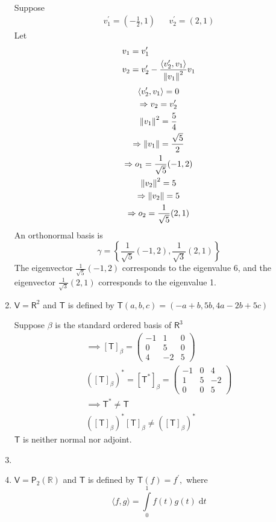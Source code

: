 \begin{enumerate}
\begin{itemize}
\begin{gather}
\end{gather}
\end{itemize}
Suppose
\begin{align}
v_1^\prime = (-\frac{1}{2},1) & & v_2^\prime = (2,1)
\end{align}
Let
\begin{align}
v_1 &= v_1^\prime\\
v_2 &= v_2^\prime - \frac{\langle v_2^\prime, v_1\rangle}{\left\lVert v_1\right\rVert^2}v_1
\end{align}
\begin{gather}
\langle v_2^\prime,v_1\rangle = 0\\
\Rightarrow v_2 = v_2^\prime\\
\left\lVert v_1\right\rVert^2 = \frac{5}{4}\\
\Rightarrow \left\lVert v_1\right\rVert = \frac{\sqrt{5}}{2}\\
\Rightarrow o_1 = \frac{1}{\sqrt{5}}(-1,2)\\
\left\lVert v_2\right\rVert^2 = 5 \\
\Rightarrow \left\lVert v_2\right\rVert =5\\
\Rightarrow o_2 = \frac{1}{\sqrt{5}}(2,1)
\end{gather}
An orthonormal basis is
\begin{equation}
\gamma = \left\{\frac{1}{\sqrt{5}}(-1,2),\frac{1}{\sqrt{3}}(2,1)\right\}
\end{equation}
The eigenvector $\frac{1}{\sqrt{5}}(-1,2)$ corresponds to the
eigenvalue 6, and the eigenvector $\frac{1}{\sqrt{3}}(2,1)$
corresponds to the eigenvalue 1.

\item $\mathsf{V} = \mathsf{R}^2$ and $\mathsf{T}$ is defined by
  $\mathsf{T}(a,b,c) = (-a+b,5b,4a-2b+5c)$

Suppose $\beta$ is the standard ordered basis of $\mathsf{R}^3$
\begin{gather}
\implies [\mathsf{T}]_\beta = \begin{pmatrix}
-1 & 1 & 0\\
0 & 5 & 0\\
4 & -2 & 5
\end{pmatrix}\\
([\mathsf{T}]_\beta)^* = [\mathsf{T}^*]_\beta = \begin{pmatrix}
-1 & 0 & 4\\
1 & 5 & -2\\
0 & 0 & 5
\end{pmatrix}\\
\implies \mathsf{T}^* \neq \mathsf{T}\\
([\mathsf{T}]_\beta)^*[\mathsf{T}]_\beta \neq ([\mathsf{T}]_\beta)^*
\end{gather}
$\mathsf{T}$ is neither normal nor adjoint.
\item
\item $\mathsf{V}= \mathsf{P}_2(\mathbb{R})$ and $\mathsf{T}$ is
  defined by $\mathsf{T}(f) = f^\prime,$ where
\[
\langle f,g \rangle = \int\limits_0^1 f(t)g(t) \; \mathrm{d}t
\]


\end{enumerate}
